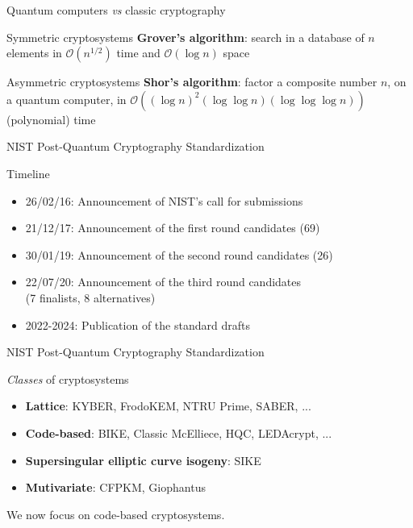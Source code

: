 \begin{frame}{Quantum computers \textit{vs} classic cryptography}
    \begin{block}{Symmetric cryptosystems}
        \textbf{Grover's algorithm}: search in a database of $n$ elements in $\mathcal{O}(n^{1/2})$ time and $\mathcal{O}(\log n)$ space
    \end{block}
    \begin{block}{Asymmetric cryptosystems}
        \textbf{Shor's algorithm}: factor a composite number $n$, on a quantum computer, in $\mathcal{O}((\log{n})^2(\log{\log{n}})(\log{\log{\log{n}}}))$ (polynomial) time
    \end{block}
\end{frame}

\begin{frame}{NIST Post-Quantum Cryptography Standardization}
    \begin{block}{Timeline}
        \begin{itemize}
            \item 26/02/16: Announcement of NIST's call for submissions
            \item 21/12/17: Announcement of the first round candidates (69)
            \item 30/01/19: Announcement of the second round candidates (26)
            \item 22/07/20: Announcement of the third round candidates\\ (7 finalists, 8 alternatives)
            \item 2022-2024: Publication of the standard drafts
        \end{itemize}
    \end{block}
\end{frame}

\begin{frame}{NIST Post-Quantum Cryptography Standardization}
    \begin{block}{\textit{Classes} of cryptosystems}
        \begin{itemize}
            \item \textbf{Lattice}: KYBER, FrodoKEM, NTRU Prime, SABER, ...
            \item \textbf{Code-based}: BIKE, Classic McElliece, HQC, LEDAcrypt, ...
            \item \textbf{Supersingular elliptic curve isogeny}: SIKE
            \item \textbf{Mutivariate}: CFPKM, Giophantus
        \end{itemize}
    \end{block}
    We now focus on code-based cryptosystems.
\end{frame}
